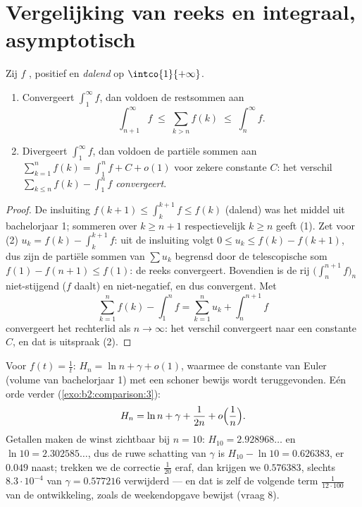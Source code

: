 \section{Vergelijking van reeks en integraal, asymptotisch}

\begin{theorem}\label{thm:b2:comparison:seriesintegral}
Zij $f$ , positief en \emph{dalend} op
$\intco{1}{+\infty}$.
\begin{enumerate}
  \item Convergeert $\int_1^{\infty} f$, dan voldoen de restsommen
        aan
        \[
        \int_{n+1}^{\infty} f \;\leq\; \sum_{k > n} f(k) \;\leq\;
        \int_{n}^{\infty} f .
        \]
  \item Divergeert $\int_1^\infty f$, dan voldoen de partiële
        sommen aan $\sum_{k=1}^{n} f(k) = \int_1^n f + C + o(1)$
        voor zekere constante $C$: het verschil $\sum_{k \leq n}
        f(k) - \int_1^n f$ \emph{convergeert}.
\end{enumerate}
\end{theorem}

\begin{proof}
De insluiting $f(k+1) \leq \int_k^{k+1} f \leq f(k)$ (dalend) was
het middel uit bachelorjaar 1; sommeren over $k \geq n+1$
respectievelijk $k \geq n$ geeft (1). Zet voor (2) $u_k = f(k) -
\int_k^{k+1} f$: uit de insluiting volgt $0 \leq u_k \leq f(k) -
f(k+1)$, dus zijn de partiële sommen van $\sum u_k$ begrensd door
de telescopische som $f(1) - f(n+1) \leq f(1)$: de reeks
convergeert. Bovendien is de rij $\bigl(\int_n^{n+1} f\bigr)_n$
niet-stijgend ($f$ daalt) en niet-negatief, en dus convergent. Met
\[
\sum_{k=1}^{n} f(k) - \int_1^n f
= \sum_{k=1}^{n} u_k + \int_n^{n+1} f
\]
convergeert het rechterlid als $n \to \infty$: het verschil
convergeert naar een constante $C$, en dat is uitspraak (2).
\end{proof}

\begin{example}\label{ex:b2:comparison:harmonic}
Voor $f(t) = \frac1t$: $H_n = \ln n + \gamma + o(1)$, waarmee de
constante van Euler (volume van bachelorjaar 1) met een schoner
bewijs wordt teruggevonden. Eén orde verder
(\cref{exo:b2:comparison:3}):
\[
H_n = \ln n + \gamma + \frac{1}{2n} + o\Bigl(\frac1n\Bigr).
\]
Getallen maken de winst zichtbaar bij $n = 10$: $H_{10} =
2.928968\dots$ en $\ln 10 = 2.302585\dots$, dus de ruwe schatting
van $\gamma$ is $H_{10} - \ln 10 = 0.626383$, er $0.049$ naast;
trekken we de correctie $\frac1{20}$ eraf, dan krijgen we
$0.576383$, slechts $8.3\cdot10^{-4}$ van $\gamma = 0.577216$
verwijderd --- en dat is zelf de volgende term
$\frac{1}{12\cdot100}$ van de ontwikkeling, zoals de
weekendopgave bewijst (vraag 8).
\end{example}


